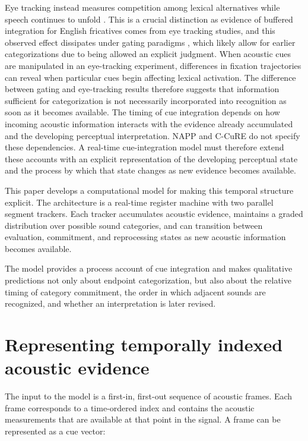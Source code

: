 \documentclass[12pt]{article}
\begin{document}
Eye tracking instead measures competition among lexical alternatives while speech continues to unfold \citep{AllopennaMagnusonTanenhaus1998}.
%
This is a crucial distinction as evidence of buffered integration for English fricatives comes from eye tracking studies, and this observed effect dissipates under gating paradigms \citep{GalleEtAl2019}, which likely allow for earlier categorizations due to being allowed an explicit judgment.
%
When acoustic cues are manipulated in an eye-tracking experiment, differences in fixation trajectories can reveal when particular cues begin affecting lexical activation.
%
The difference between gating and eye-tracking results therefore suggests that information sufficient for categorization is not necessarily incorporated into recognition as soon as it becomes available.
%
The timing of cue integration depends on how incoming acoustic information interacts with the evidence already accumulated and the developing perceptual interpretation.
%
NAPP and C-CuRE do not specify these dependencies.
%
A real-time cue-integration model must therefore extend these accounts with an explicit representation of the developing perceptual state and the process by which that state changes as new evidence becomes available.

This paper develops a computational model for making this temporal structure explicit. 
%
The architecture is a real-time register machine with two parallel segment trackers. 
%
Each tracker accumulates acoustic evidence, maintains a graded distribution over possible sound categories, and can transition between evaluation, commitment, and reprocessing states as new acoustic information becomes available. 

The model provides a process account of cue integration and makes qualitative predictions not only about endpoint categorization, but also about the relative timing of category commitment, the order in which adjacent sounds are recognized, and whether an interpretation is later revised.

\section{Representing temporally indexed acoustic evidence}

The input to the model is a first-in, first-out sequence of acoustic frames. 
% 
Each frame corresponds to a time-ordered index and contains the acoustic measurements that are available at that point in the signal. 
%
A frame can be represented as a cue vector:
\end{document}
